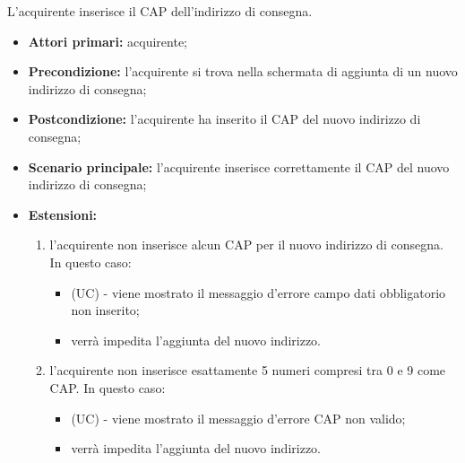 L'acquirente inserisce il CAP dell'indirizzo di consegna.
\begin{itemize}
    \item \textbf{Attori primari:} acquirente;
    \item \textbf{Precondizione:} l'acquirente si trova nella schermata di aggiunta di un nuovo indirizzo di consegna;
    \item \textbf{Postcondizione:} l'acquirente ha inserito il CAP del nuovo indirizzo di consegna;
    \item \textbf{Scenario principale:} l'acquirente inserisce correttamente il CAP del nuovo indirizzo di consegna;
    \item \textbf{Estensioni:}
    \begin{enumerate}[label=\lett]
        \item l'acquirente non inserisce alcun CAP per il nuovo indirizzo di consegna. In questo caso:
        \begin{itemize}
            \item (UC) - viene mostrato il messaggio d'errore campo dati obbligatorio non inserito;
            \item verrà impedita l'aggiunta del nuovo indirizzo.
        \end{itemize}
        \item l'acquirente non inserisce esattamente 5 numeri compresi tra 0 e 9 come CAP. In questo caso:
        \begin{itemize}
            \item (UC) - viene mostrato il messaggio d'errore CAP non valido;
            \item verrà impedita l'aggiunta del nuovo indirizzo.
        \end{itemize}
    \end{enumerate}
\end{itemize}


